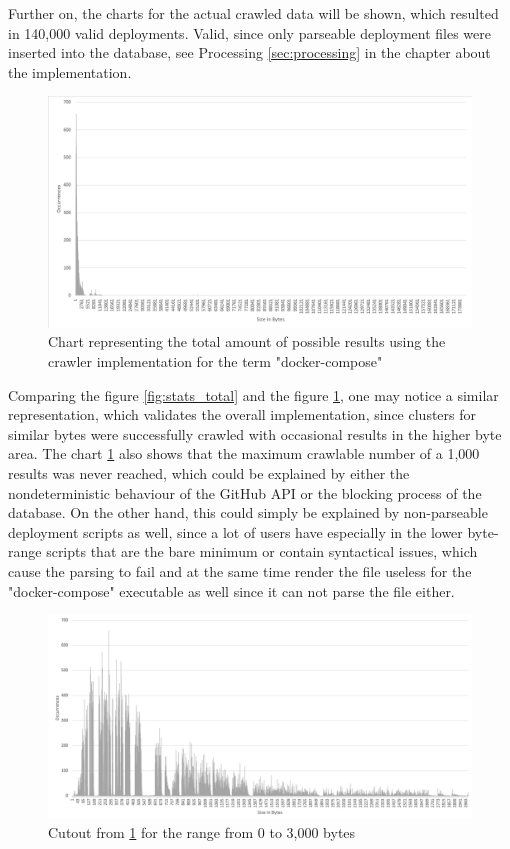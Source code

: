 Further on, the charts for the actual crawled data will be shown, which resulted in 140,000 valid deployments. Valid, since only parseable deployment files were inserted into the database, see Processing \ref{sec:processing} in the chapter about the implementation.

\begin{figure}[H]
    \centering
    \includegraphics[scale=0.5]{graphics/deployment_stats_total_bw.png}
    \caption{Chart representing the total amount of possible results using the crawler implementation for the term "docker-compose"}
    \label{fig:deployment_total}
\end{figure}

Comparing the figure \ref{fig:stats_total} and the figure \ref{fig:deployment_total}, one may notice a similar representation, which validates the overall implementation, since clusters for similar bytes were successfully crawled with occasional results in the higher byte area.
The chart \ref{fig:deployment_total} also shows that the maximum crawlable number of a 1,000 results was never reached, which could be explained by either the nondeterministic behaviour of the GitHub API or the blocking process of the database. On the other hand, this could simply be explained by non-parseable deployment scripts as well, since a lot of users have especially in the lower byte-range scripts that are the bare minimum or contain syntactical issues, which cause the parsing to fail and at the same time render the file useless for the "docker-compose" executable as well since it can not parse the file either.

\begin{figure}[H]
    \centering
    \includegraphics[scale=0.5]{graphics/deployment_stats_range_bw.png}
    \caption{Cutout from \ref{fig:deployment_total} for the range from 0 to 3,000 bytes}
    \label{fig:deployment_range}
\end{figure}

